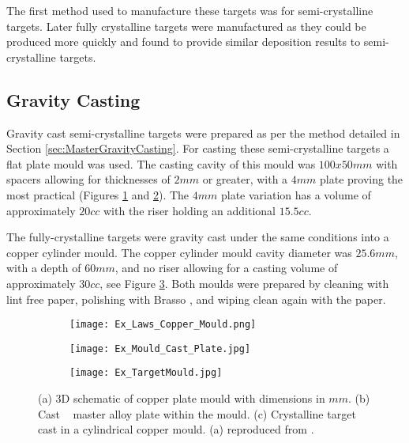 The first method used to manufacture these targets was for semi-crystalline targets. Later fully crystalline targets were manufactured as they could be produced more quickly and found to provide similar deposition results to semi-crystalline targets.

\subsection{Gravity Casting}
Gravity cast semi-crystalline targets were prepared as per the method detailed in Section \ref{sec:MasterGravityCasting}. For casting these semi-crystalline targets a flat plate mould was used. The casting cavity of this mould was $100 x 50 mm$ with spacers allowing for thicknesses of $2 mm$ or greater, with a $4 mm$ plate proving the most practical (Figures \ref{fig:LawsMould} and \ref{fig:FilledMould}). The $4 mm$ plate variation has a volume of approximately $20 cc$ with the riser holding an additional $15.5 cc$. 

The fully-crystalline targets were gravity cast under the same conditions into a copper cylinder mould. The copper cylinder mould cavity diameter was $25.6 mm$, with a depth of $60 mm$, and no riser allowing for a casting volume of approximately $30 cc$, see Figure \ref{fig:Xtal_Casting_Target}. Both moulds were prepared by cleaning with lint free paper, polishing with Brasso \textcopyright, and wiping clean again with the paper.

\begin{figure}[htbp]
	\centering
	\begin{subfigure}[htbp]{0.41\textwidth}
		\texttt{[image: Ex\_Laws\_Copper\_Mould.png]}
		\caption{}
		\label{fig:LawsMould}
	\end{subfigure}
	\begin{subfigure}[htbp]{0.49\textwidth}
		\texttt{[image: Ex\_Mould\_Cast\_Plate.jpg]}
		\caption{}
		\label{fig:FilledMould}
	\end{subfigure}
	\begin{subfigure}[htbp]{0.463\textwidth}
		\texttt{[image: Ex\_TargetMould.jpg]}
		\caption{}
		\label{fig:Xtal_Casting_Target}
	\end{subfigure}
	\caption[(a) 3D schematic of copper plate mould with dimensions in $mm$. (b) Cast \MgZnCa~ master alloy plate within the mould. (c) Crystalline target cast in a cylindrical copper mould.]{(a) 3D schematic of copper plate mould with dimensions in $mm$. (b) Cast \MgZnCa~ master alloy plate within the mould. (c) Crystalline target cast in a cylindrical copper mould. (a) reproduced from \cite{Laws2007}.}%
	\label{fig:PlateMould}
\end{figure}

